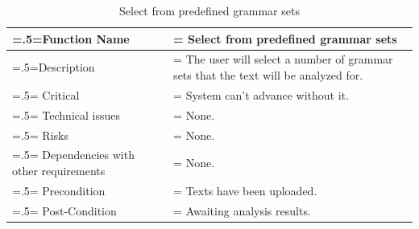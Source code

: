 \begin{center}
    \begin{table}[H]
        \caption{Select from predefined grammar sets}
        \begin{tabularx}{\textwidth} {
                | >{\raggedright\arraybackslash\hsize=.5\hsize\linewidth=\hsize}X
                | >{\raggedright\arraybackslash\hsize=1.5\hsize\linewidth=\hsize}X |}
            \hline
            Function Name                        & Select from predefined grammar sets                                               \\ \hline
            Description                          & The user will select a number of grammar sets that the text will be analyzed for. \\ \hline
            Critical                             & System can't advance without it.                                                  \\ \hline
            Technical issues                     & None.                                                                             \\ \hline
            Risks                                & None.                                                                             \\ \hline
            Dependencies with other requirements & None.                                                                             \\ \hline
            Precondition                         & Texts have been uploaded.                                                         \\ \hline
            Post-Condition                       & Awaiting analysis results.                                                        \\ \hline
        \end{tabularx}
    \end{table}
\end{center}

